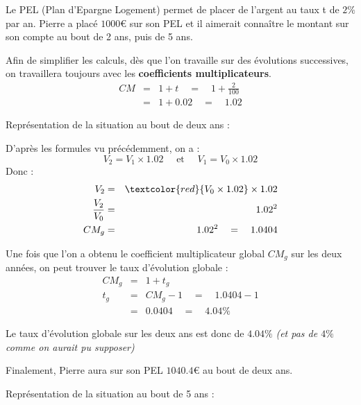 \begin{ex}{}{}
Le PEL (Plan d'Epargne Logement) permet de placer de l'argent au taux t de $2\%$ par an. Pierre a placé $1000$€ sur son PEL et il aimerait connaître le montant sur son compte au bout de 2 ans, puis de 5 ans.
\bigbreak

Afin de simplifier les calculs, dès que l'on travaille sur des évolutions successives, on travaillera toujours avec les \textbf{coefficients multiplicateurs}.
\begin{eqnarray*}
CM &=& 1 + t \quad = \quad 1 + \frac{2}{100} \\
&=& 1 + 0.02 \quad = \quad 1.02 
\end{eqnarray*}

Représentation de la situation au bout de deux ans :
\begin{center}
\end{center}

D'après les formules vu précédemment, on a :
\[V_{2} = V_{1}\times 1.02 \quad \text{ et } \quad V_{1} = V_{0}\times 1.02\]
Donc :
\begin{eqnarray*}
V_{2} &=& \textcolor{red}{V_{0}\times 1.02} \times 1.02\\
\frac{V_{2}}{V_{0}} &=& 1.02^{2}\\
CM_{g} &=& 1.02^{2} \quad = \quad 1.0404
\end{eqnarray*}

Une fois que l'on a obtenu le coefficient multiplicateur global $CM_{g}$ sur les deux années, on peut trouver le taux d'évolution globale :
\begin{eqnarray*}
CM_{g} &=& 1 + t_{g}\\
t_{g} &=& CM_{g} - 1 \quad = \quad 1.0404 - 1\\
&=& 0.0404 \quad = \quad 4.04 \%
\end{eqnarray*}

Le taux d'évolution globale sur les deux ans est donc de $4.04\%$ \textit{(et pas de $4\%$ comme on aurait pu supposer)}

Finalement, Pierre aura sur son PEL $1040.4$€ au bout de deux ans.
\bigbreak

Représentation de la situation au bout de 5 ans :
\begin{center}
\end{center}


\end{ex}
